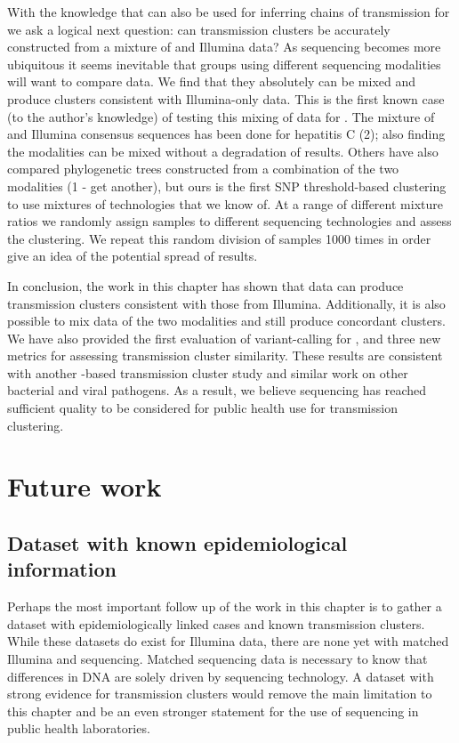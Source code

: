 With the knowledge that \ont{} can also be used for inferring chains of transmission for \mtb{} we ask a logical next question: can transmission clusters be accurately constructed from a mixture of \ont{} and Illumina data? As \ont{} sequencing becomes more ubiquitous it seems inevitable that groups using different sequencing modalities will want to compare data. We find that they absolutely can be mixed and produce clusters consistent with Illumina-only data. This is the first known case (to the author's knowledge) of testing this mixing of data for \mtb{}. The mixture of \ont{} and Illumina consensus sequences has been done for hepatitis C (2); also finding the modalities can be mixed without a degradation of results. Others have also compared phylogenetic trees constructed from a combination of the two modalities (1 - get another), but ours is the first SNP threshold-based clustering to use mixtures of technologies that we know of. 
At a range of different mixture ratios we randomly assign samples to different sequencing technologies and assess the clustering. We repeat this random division of samples 1000 times in order give an idea of the potential spread of results. 

In conclusion, the work in this chapter has shown that \ont{} data can produce transmission clusters consistent with those from Illumina. Additionally, it is also possible to mix data of the two modalities and still produce concordant clusters. We have also provided the first evaluation of \ont{} variant-calling for \mtb{}, and three new metrics for assessing transmission cluster similarity.
These results are consistent with another \mtb{} \ont{}-based transmission cluster study and similar work on other bacterial and viral pathogens. As a result, we believe \ont{} sequencing has reached sufficient quality to be considered for public health use for transmission clustering.


\section{Future work}

\subsection{Dataset with known epidemiological information}
Perhaps the most important follow up of the work in this chapter is to gather a dataset with epidemiologically linked cases and known transmission clusters. While these datasets do exist for Illumina data, there are none yet with matched Illumina and \ont{} sequencing. Matched sequencing data is necessary to know that differences in DNA are solely driven by sequencing technology. A dataset with strong evidence for transmission clusters would remove the main limitation to this chapter and be an even stronger statement for the use of \ont{} sequencing in public health laboratories.

